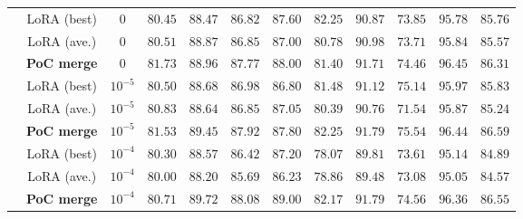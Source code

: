 \begin{table*}[th]
\begin{footnotesize}
\begin{tabular}{cccccccccccc}
            & LoRA (best) & $0$ & $80.45$ & $88.47$ & $86.82$ & $87.60$ & $82.25$ & $90.87$ & $73.85$ & $95.78$ & $85.76$ \\
            & LoRA (ave.) & $0$  & $80.51$ & $88.87$ & $86.85$ & $87.00$ & $80.78$ & $90.98$ & $73.71$ & $95.84$ & $85.57$ \\
            & \textbf{PoC merge} & $0$ & $81.73$ & $88.96$ & $87.77$ & $88.00$ & $81.40$ & $91.71$ & $74.46$ & $96.45$ & $86.31$ \\
            \cmidrule(lr){2-12}
            & LoRA (best) & $10^{-5}$ & $80.50$ & $88.68$ & $86.98$ & $86.80$ & $81.48$ & $91.12$ & $75.14$ & $95.97$ & $85.83$ \\
            & LoRA (ave.) & $10^{-5}$  & $80.83$ & $88.64$ & $86.85$ & $87.05$ & $80.39$ & $90.76$ & $71.54$ & $95.87$ & $85.24$ \\
            & \textbf{PoC merge} & $10^{-5}$ & $81.53$ & $89.45$ & $87.92$ & $87.80$ & $82.25$ & $91.79$ & $75.54$ & $96.44$ & $86.59$ \\
            \cmidrule(lr){2-12}
            & LoRA (best) & $10^{-4}$ & $80.30$ & $88.57$ & $86.42$ & $87.20$ & $78.07$ & $89.81$ & $73.61$ & $95.14$ & $84.89$ \\
            & LoRA (ave.) & $10^{-4}$ & $80.00$ & $88.20$ & $85.69$ & $86.23$ & $78.86$ & $89.48$ & $73.08$ & $95.05$ & $84.57$ \\
            & \textbf{PoC merge} & $10^{-4}$ & $80.71$ & $89.72$ & $88.08$ & $89.00$ & $82.17$ & $91.79$ & $74.56$ & $96.36$ & $86.55$ \\
        \bottomrule
    \end{tabular}
    \end{footnotesize}
\end{table*}
